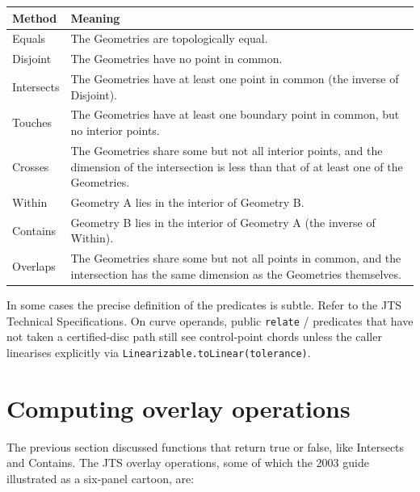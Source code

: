 \documentclass[11pt]{article}
\begin{document}
\begin{center}
\begin{tabular}{>{\raggedright\arraybackslash}p{2.6cm}p{10.6cm}}
  \toprule
  \textbf{Method} & \textbf{Meaning} \\
  \midrule
  Equals     & The Geometries are topologically equal. \\
  Disjoint   & The Geometries have no point in common. \\
  Intersects & The Geometries have at least one point in common
               (the inverse of Disjoint). \\
  Touches    & The Geometries have at least one boundary point in
               common, but no interior points. \\
  Crosses    & The Geometries share some but not all interior points,
               and the dimension of the intersection is less than that
               of at least one of the Geometries. \\
  Within     & Geometry A lies in the interior of Geometry B. \\
  Contains   & Geometry B lies in the interior of Geometry A
               (the inverse of Within). \\
  Overlaps   & The Geometries share some but not all points in common,
               and the intersection has the same dimension as the
               Geometries themselves. \\
  \bottomrule
\end{tabular}
\end{center}

In some cases the precise definition of the predicates is subtle.
Refer to the JTS Technical Specifications. On curve operands, public
\texttt{relate} / predicates that have not taken a certified-disc path
still see control-point chords unless the caller linearises explicitly
via \texttt{Linearizable.toLinear(tolerance)}.

\section{Computing overlay operations}
The previous section discussed functions that return true or false,
like Intersects and Contains. The JTS overlay operations, some of
which the 2003 guide illustrated as a six-panel cartoon, are:
\end{document}
